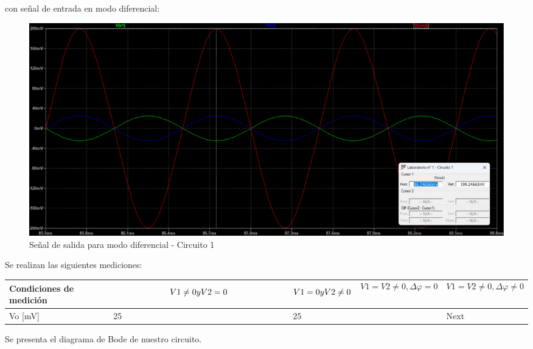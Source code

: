 con señal de entrada en modo diferencial:

\begin{figure}[h!]
    \centering
    \includegraphics[width=1\linewidth]{Secciones/Circuito1/circuito1_diferencial.png}
    
    \caption{Señal de salida para modo diferencial - Circuito 1}
    \label{fig:enter-label}
\end{figure}

Se realizan las siguientes mediciones:
    
\begin{table}[ht]
    \centering


    \begin{tabular}{|p{0.3\linewidth}  |p{0.6\linewidth}  |p{0.6\linewidth}  |p{0.6\linewidth}  |p{0.6\linewidth}|} \hline 
      Condiciones de medición & \[V1\neq0 \space y \space V2=0 \] & \[V1=0 \space y \space   V2\neq0 \] & \[V1=V2\neq0, \Delta\varphi=0\]
      & \[V1=V2\neq0, \Delta\varphi\neq0\] \\ \hline
      Vo [mV] & 25& 25& & Next
     \\ \hline\end{tabular}
    
    
\end{table}

Se presenta el diagrama de Bode de nuestro circuito.
